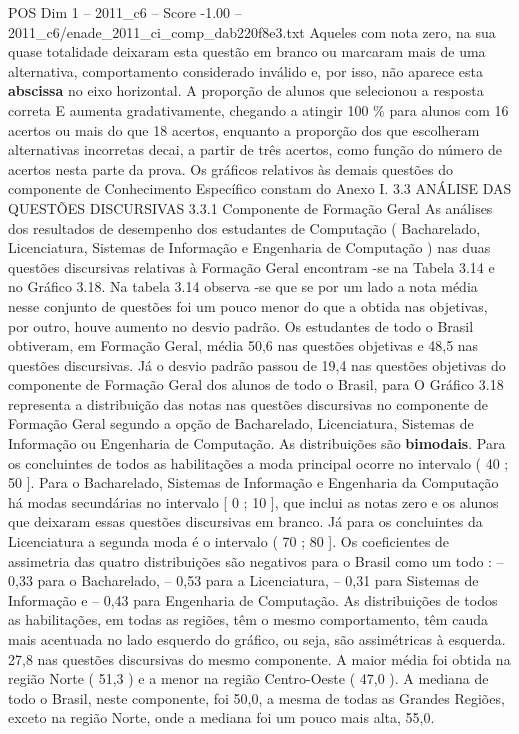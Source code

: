 \begin{textsample}{POS Dim 1 – 2011\_c6 – Score -1.00 – 2011\_c6/enade\_2011\_ci\_comp\_dab220f8e3.txt}
Aqueles com nota zero, na sua quase totalidade deixaram esta questão em branco ou marcaram mais de uma alternativa, comportamento considerado inválido e, por isso, não aparece esta \textbf{abscissa} no eixo horizontal.
A proporção de alunos que selecionou a resposta correta E aumenta gradativamente, chegando a atingir 100 \% para alunos com 16 acertos ou mais do que 18 acertos, enquanto a proporção dos que escolheram alternativas incorretas decai, a partir de três acertos, como função do número de acertos nesta parte da prova.
Os gráficos relativos às demais questões do componente de Conhecimento Específico constam do Anexo I. 3.3 ANÁLISE DAS QUESTÕES DISCURSIVAS 3.3.1 Componente de Formação Geral As análises dos resultados de desempenho dos estudantes de Computação ( Bacharelado, Licenciatura, Sistemas de Informação e Engenharia de Computação ) nas duas questões discursivas relativas à Formação Geral encontram -se na Tabela 3.14 e no Gráfico 3.18.
Na tabela 3.14 observa -se que se por um lado a nota média nesse conjunto de questões foi um pouco menor do que a obtida nas objetivas, por outro, houve aumento no desvio padrão.
Os estudantes de todo o Brasil obtiveram, em Formação Geral, média 50,6 nas questões objetivas e 48,5 nas questões discursivas.
Já o desvio padrão passou de 19,4 nas questões objetivas do componente de Formação Geral dos alunos de todo o Brasil, para O Gráfico 3.18 representa a distribuição das notas nas questões discursivas no componente de Formação Geral segundo a opção de Bacharelado, Licenciatura, Sistemas de Informação ou Engenharia de Computação.
As distribuições são \textbf{bimodais}.
Para os concluintes de todos as habilitações a moda principal ocorre no intervalo ( 40 ; 50 ].
Para o Bacharelado, Sistemas de Informação e Engenharia da Computação há modas secundárias no intervalo [ 0 ; 10 ], que inclui as notas zero e os alunos que deixaram essas questões discursivas em branco.
Já para os concluintes da Licenciatura a segunda moda é o intervalo ( 70 ; 80 ].
Os coeficientes de assimetria das quatro distribuições são negativos para o Brasil como um todo : – 0,33 para o Bacharelado, – 0,53 para a Licenciatura, – 0,31 para Sistemas de Informação e – 0,43 para Engenharia de Computação.
As distribuições de todos as habilitações, em todas as regiões, têm o mesmo comportamento, têm cauda mais acentuada no lado esquerdo do gráfico, ou seja, são assimétricas à esquerda. 27,8 nas questões discursivas do mesmo componente.
A maior média foi obtida na região Norte ( 51,3 ) e a menor na região Centro-Oeste ( 47,0 ).
A mediana de todo o Brasil, neste componente, foi 50,0, a mesma de todas as Grandes Regiões, exceto na região Norte, onde a mediana foi um pouco mais alta, 55,0.

\end{textsample}
